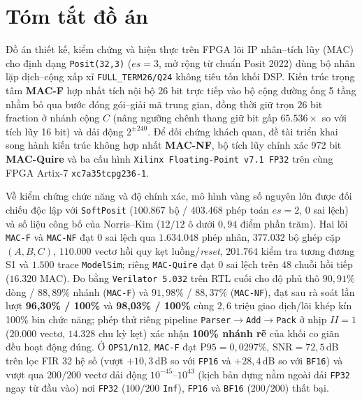 
\linespread{1.16}



\hypersetup{pageanchor=false}

\hypersetup{pageanchor=true}

\chapter*{Tóm tắt đồ án}
Đồ án thiết kế, kiểm chứng và hiện thực trên FPGA lõi IP nhân--tích lũy (MAC)
cho định dạng \texttt{Posit(32,3)} ($es=3$, mở rộng từ chuẩn Posit 2022) dùng
bộ nhân lặp dịch--cộng xấp xỉ \texttt{FULL\_TERM26/Q24} không tiêu tốn khối DSP.
Kiến trúc trọng tâm \textbf{MAC-F} hợp nhất tích nội bộ 26 bit trực tiếp vào bộ
cộng đường ống 5 tầng nhằm bỏ qua bước đóng gói--giải mã trung gian, đồng thời giữ
trọn $26$ bit fraction ở nhánh cộng $C$ (nâng ngưỡng chênh thang giữ bit gấp
$65.536\times$ so với tích lũy 16 bit) và dải động $2^{\pm 240}$. Để đối chứng
khách quan, đề tài triển khai song hành kiến trúc không hợp nhất \textbf{MAC-NF},
bộ tích lũy chính xác 972 bit \textbf{MAC-Quire} và ba cấu hình \texttt{Xilinx
Floating-Point v7.1 FP32} trên cùng FPGA Artix-7 \texttt{xc7a35tcpg236-1}.

Về kiểm chứng chức năng và độ chính xác, mô hình vàng số nguyên lớn được đối
chiếu độc lập với \texttt{SoftPosit} ($100.867$ bộ / $403.468$ phép toán $es=2$,
$0$ sai lệch) và số liệu công bố của Norris--Kim ($12/12$ ô dưới $0{,}94$ điểm phần trăm). Hai
lõi \texttt{MAC-F} và \texttt{MAC-NF} đạt $0$ sai lệch qua $1.634.048$ phép nhân,
$377.032$ bộ ghép cặp $(A,B,C)$, $110.000$ vectơ hồi quy kẹt luồng/\textit{reset},
$201.764$ kiểm tra tương đương S1 và $1.500$ trace \texttt{ModelSim}; riêng
\texttt{MAC-Quire} đạt $0$ sai lệch trên $48$ chuỗi hồi tiếp ($16.320$ MAC). Đo
bằng \texttt{Verilator 5.032} trên RTL cuối cho độ phủ thô $90{,}91\%$ dòng /
$88{,}89\%$ nhánh (\texttt{MAC-F}) và $91{,}98\%$ / $88{,}37\%$ (\texttt{MAC-NF}),
đạt sau rà soát lần lượt \textbf{96,30\% / 100\%} và \textbf{98,03\% / 100\%}
cùng $2{,}6$ triệu giao dịch/lõi khép kín 100\% bin chức năng; phép thử riêng
pipeline \texttt{Parser$\to$Add$\to$Pack} ở nhịp $II=1$ ($20.000$ vectơ, $14.328$
chu kỳ kẹt) xác nhận \textbf{100\% nhánh rẽ} của khối co giãn đều hoạt động đúng.
Ở \texttt{OPS1/n12}, \texttt{MAC-F} đạt $\mathrm{P95}=0{,}0297\%$, $\mathrm{SNR}=72{,}5$\,dB
trên lọc FIR 32 hệ số (vượt $+10{,}3$\,dB so với \texttt{FP16} và $+28{,}4$\,dB so với
\texttt{BF16}) và vượt qua $200/200$ vectơ dải động $10^{-45}\text{--}10^{43}$
(kịch bản dựng nằm ngoài dải \texttt{FP32} ngay từ đầu vào) nơi
\texttt{FP32} ($100/200$ \texttt{Inf}), \texttt{FP16} và \texttt{BF16} ($200/200$)
thất bại.

